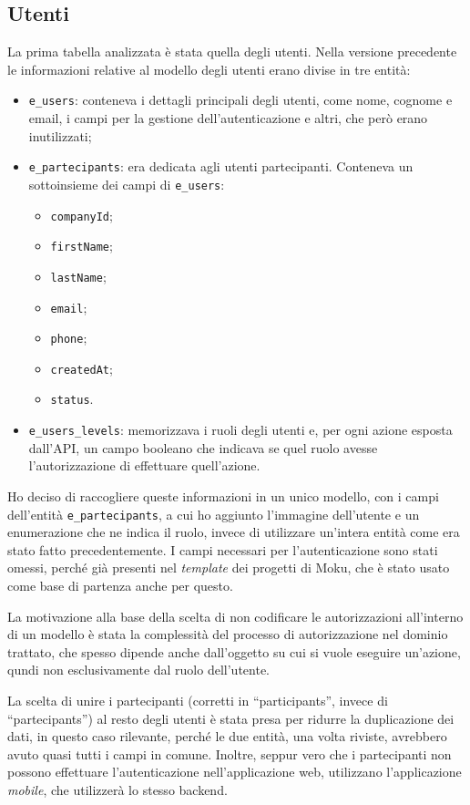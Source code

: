 \subsection{Utenti}
La prima tabella analizzata è stata quella degli utenti. Nella versione precedente le informazioni relative al modello degli utenti erano divise in tre entità:
\begin{itemize}
	\item \verb|e_users|: conteneva i dettagli principali degli utenti, come nome, cognome e email, i campi per la gestione dell'autenticazione e altri, che però erano inutilizzati;
	\item \verb|e_partecipants|: era dedicata agli utenti partecipanti. Conteneva un sottoinsieme dei campi di \verb|e_users|:
	\begin{itemize}
		\item \verb|companyId|;
		\item \verb|firstName|;
		\item \verb|lastName|;
		\item \verb|email|;
		\item \verb|phone|;
		\item \verb|createdAt|;
		\item \verb|status|.
	\end{itemize}
	\item \verb|e_users_levels|: memorizzava i ruoli degli utenti e, per ogni azione esposta dall'API, un campo booleano che indicava se quel ruolo avesse l'autorizzazione di effettuare quell'azione.
\end{itemize}
Ho deciso di raccogliere queste informazioni in un unico modello, con i campi dell'entità \verb|e_partecipants|, a cui ho aggiunto l'immagine dell'utente e un enumerazione che ne indica il ruolo, invece di utilizzare un'intera entità come era stato fatto precedentemente. I campi necessari per l'autenticazione sono stati omessi, perché già presenti nel \emph{template} dei progetti di Moku, che è stato usato come base di partenza anche per questo.

La motivazione alla base della scelta di non codificare le autorizzazioni all'interno di un modello è stata la complessità del processo di autorizzazione nel dominio trattato, che spesso dipende anche dall'oggetto su cui si vuole eseguire un'azione, qundi non esclusivamente dal ruolo dell'utente.

La scelta di unire i partecipanti (corretti in ``participants'', invece di ``partecipants'') al resto degli utenti è stata presa per ridurre la duplicazione dei dati, in questo caso rilevante, perché le due entità, una volta riviste, avrebbero avuto quasi tutti i campi in comune. Inoltre, seppur vero che i partecipanti non possono effettuare l'autenticazione nell'applicazione web, utilizzano l'applicazione \emph{mobile}, che utilizzerà lo stesso backend.
